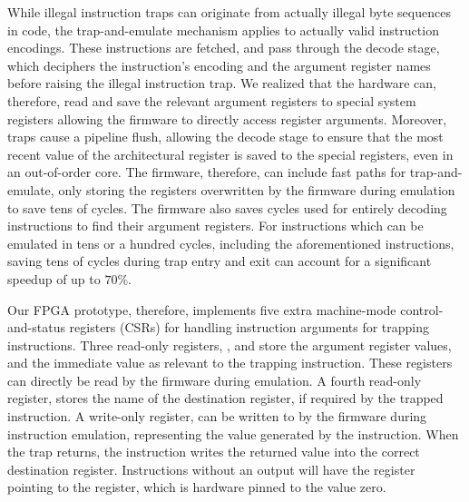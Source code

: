 While illegal instruction traps can originate from actually illegal
byte sequences in code, the trap-and-emulate mechanism applies to
actually valid instruction encodings.
These instructions are fetched, and pass through the decode stage, which
deciphers the instruction's encoding and the argument register names
before raising the illegal instruction trap.
We realized that the hardware can, therefore, read and save the relevant
argument registers to special system registers allowing the firmware to
directly access register arguments.
Moreover, traps cause a pipeline flush, allowing the decode stage to ensure
that the most recent value of the architectural register is saved to
the special registers, even in an out-of-order core.
The firmware, therefore, can include fast paths for trap-and-emulate,
only storing the registers overwritten by the firmware during emulation to
save tens of cycles.
The firmware also saves cycles used for entirely decoding instructions to
find their argument registers.
For instructions which can be emulated in tens or a hundred cycles,
including the aforementioned \seccells instructions, saving tens of cycles
during trap entry and exit can account for a significant speedup of
up to $70\%$.

Our FPGA prototype, therefore, implements five extra machine-mode 
control-and-status registers (CSRs)
for handling instruction arguments for trapping instructions.
Three read-only registers, ,  and 
store the argument register values, and the immediate value as relevant to 
the trapping instruction.
These registers can directly be read by the firmware during emulation.
A fourth read-only register,  stores the name of the
destination register, if required by the trapped instruction.
A write-only register,  can be written to by the firmware
during instruction emulation, representing the value generated by the
instruction.
When the trap returns, the  instruction writes the returned value
into the correct destination register.
Instructions without an output will have the  register pointing
to the  register, which is hardware pinned to the value zero.


